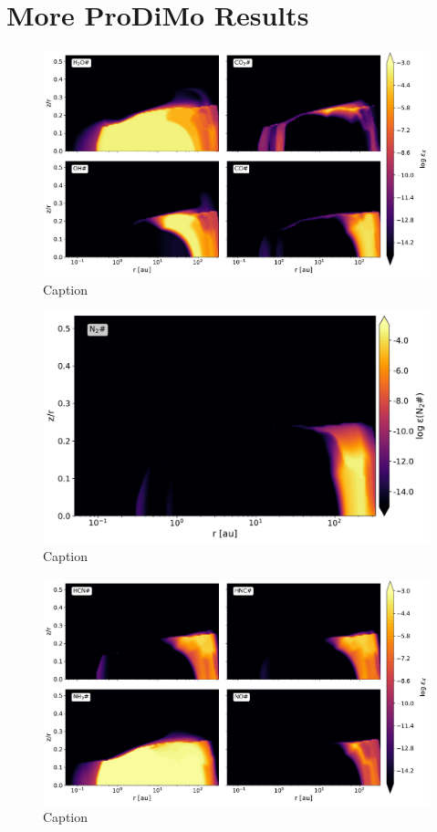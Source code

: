 \documentclass[oneside, single, authoryear, semicolon, 12pt]{lion-msc}
\newcommand{\4}{$_4$}
\newcommand{\3}{$_3$}
\newcommand{\2}{$_2$}
\begin{document}




\appendix
\chapter{More ProDiMo Results}
\begin{figure}
    \centering
    \includegraphics[width=\linewidth]{Figures/Abundance1ice.pdf}
    \caption{Caption}
    \label{fig:enter-label}
\end{figure}
\begin{figure}
    \centering
    \includegraphics[width=\linewidth]{Figures/AbundanceN2ice.pdf}
    \caption{Caption}
    \label{fig:enter-label}
\end{figure}
\begin{figure}
    \centering
    \includegraphics[width=\linewidth]{Figures/Abundance2ice.pdf}
    \caption{Caption}
    \label{fig:enter-label}
\end{figure}
\end{document}
